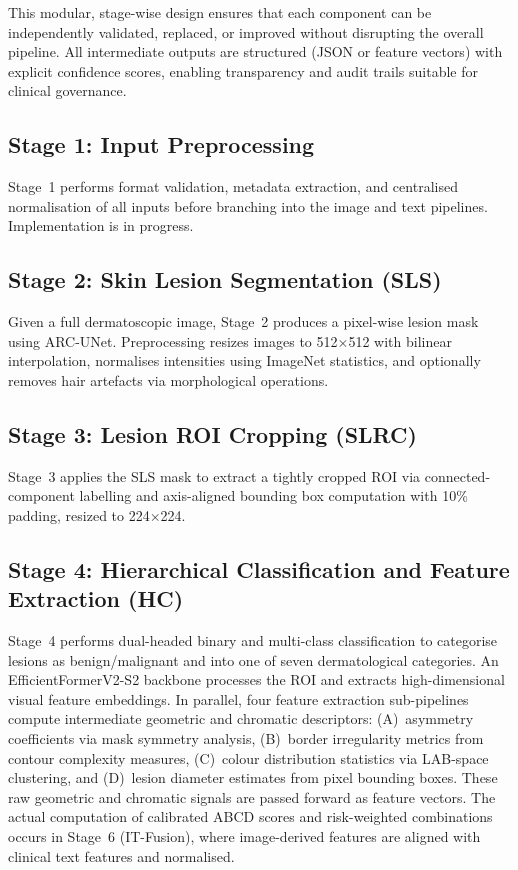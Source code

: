 \documentclass[conference]{IEEEtran}
\begin{document}
This modular, stage-wise design ensures that each component can be independently
validated, replaced, or improved without disrupting the overall pipeline. All
intermediate outputs are structured (JSON or feature vectors) with explicit
confidence scores, enabling transparency and audit trails suitable for clinical
governance.

\subsection{Stage 1: Input Preprocessing}

Stage~1 performs format validation, metadata extraction, and
centralised normalisation of all inputs before branching into the image
and text pipelines. Implementation is in progress.

\subsection{Stage 2: Skin Lesion Segmentation (SLS)}

Given a full dermatoscopic image, Stage~2 produces a pixel-wise lesion
mask using ARC-UNet. Preprocessing resizes images to
512$\times$512 with bilinear interpolation, normalises intensities
using ImageNet statistics, and optionally removes hair artefacts via
morphological operations.

\subsection{Stage 3: Lesion ROI Cropping (SLRC)}

Stage~3 applies the SLS mask to extract a tightly cropped ROI via
connected-component labelling and axis-aligned bounding box computation
with 10\% padding, resized to 224$\times$224.

\subsection{Stage 4: Hierarchical Classification and Feature Extraction (HC)}

Stage~4 performs dual-headed binary and multi-class classification to
categorise lesions as benign/malignant and into one of seven dermatological
categories. An EfficientFormerV2-S2 backbone processes the ROI and
extracts high-dimensional visual feature embeddings. In parallel, four
feature extraction sub-pipelines compute intermediate geometric and
chromatic descriptors: (A)~asymmetry coefficients via mask symmetry
analysis, (B)~border irregularity metrics from contour complexity measures,
(C)~colour distribution statistics via LAB-space clustering, and (D)~lesion
diameter estimates from pixel bounding boxes. These raw geometric and
chromatic signals are passed forward as feature vectors. The actual
computation of calibrated ABCD scores and risk-weighted combinations
occurs in Stage~6 (IT-Fusion), where image-derived features are aligned
with clinical text features and normalised.
\end{document}
